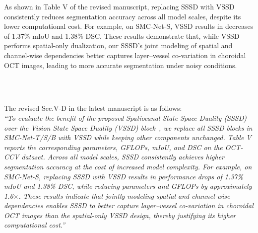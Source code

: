 \documentclass[11pt]{article}
\begin{document}
\begin{enumerate}
{    As shown in Table V of the revised manuscript, replacing SSSD with VSSD consistently reduces segmentation accuracy across all model scales, despite its lower computational cost.
    For example, on SMC-Net-S, VSSD results in decreases of 1.37\% mIoU and 1.38\% DSC.
    These results demonstrate that, while VSSD performs spatial-only dualization, our SSSD’s joint modeling of spatial and channel-wise dependencies better captures layer--vessel co-variation in choroidal OCT images, leading to more accurate segmentation under noisy conditions.
    \begin{table}[h]
    \centering
    \begingroup\color{blue}
    \captionsetup[table]{name=Table V.}{Table V: SSSD vs. VSSD comparison on OCT-CCV dataset (SMC-Net-T/S/B, vessel segmentation target).}\\
    \label{tab:sssd_vssd}
    \endgroup
    \end{table}\\
    The revised Sec.V-D in the latest manuscript is as follows:\\
    \textit{{\color{blue}``To evaluate the benefit of the proposed Spatiocanal State Space Duality (SSSD) over the Vision State Space Duality (VSSD) block~\cite{shi2024vssdvisionmambanoncausal}, we replace all SSSD blocks in SMC-Net-T/S/B with VSSD while keeping other components unchanged.
    Table V reports the corresponding parameters, GFLOPs, mIoU, and DSC on the OCT-CCV dataset.
    Across all model scales, SSSD consistently achieves higher segmentation accuracy at the cost of increased model complexity.
    For example, on SMC-Net-S, replacing SSSD with VSSD results in performance drops of 1.37\% mIoU and 1.38\% DSC, while reducing parameters and GFLOPs by approximately 1.6$\times$.
    These results indicate that jointly modeling spatial and channel-wise dependencies enables SSSD to better capture layer--vessel co-variation in choroidal OCT images than the spatial-only VSSD design, thereby justifying its higher computational cost.''}}\\
    }


\end{enumerate}
\end{document}
